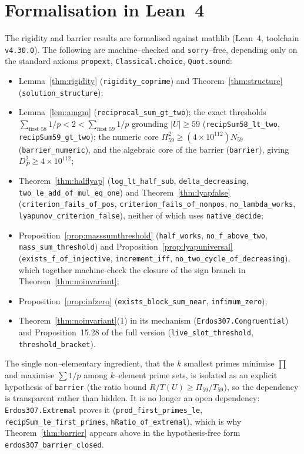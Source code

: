 \documentclass[11pt]{article}
\theoremstyle{definition}
\begin{document}
\section{Formalisation in Lean~4}\label{sec:lean}

The rigidity and barrier results are formalised against mathlib (Lean~4, toolchain
\texttt{v4.30.0}). The following are machine--checked and \texttt{sorry}--free, depending only on the
standard axioms \texttt{propext}, \texttt{Classical.choice}, \texttt{Quot.sound}:
\begin{itemize}[leftmargin=1.4em]
\item Lemma~\ref{thm:rigidity} (\texttt{rigidity\_coprime}) and Theorem~\ref{thm:structure}
(\texttt{solution\_structure});
\item Lemma~\ref{lem:amgm} (\texttt{reciprocal\_sum\_gt\_two}); the exact thresholds
$\sum_{\text{first }58}1/p<2<\sum_{\text{first }59}1/p$ grounding $|U|\ge59$
(\texttt{recipSum58\_lt\_two}, \texttt{recipSum59\_gt\_two}); the numeric core
$\Pi_{59}^2\ge(4\times10^{112})N_{59}$ (\texttt{barrier\_numeric}), and the algebraic core of the
barrier (\texttt{barrier}), giving $D_P^2\ge4\times10^{112}$;
\item Theorem~\ref{thm:halflyap} (\texttt{log\_lt\_half\_sub}, \texttt{delta\_decreasing},
\texttt{two\_le\_add\_of\_mul\_eq\_one}) and Theorem~\ref{thm:lyapfalse}
(\texttt{criterion\_fails\_of\_pos}, \texttt{criterion\_fails\_of\_nonpos},
\texttt{no\_lambda\_works}, \texttt{lyapunov\_criterion\_false}), neither of which uses
\texttt{native\_decide};
\item Proposition~\ref{prop:masssumthreshold} (\texttt{half\_works}, \texttt{no\_f\_above\_two},
\texttt{mass\_sum\_threshold}) and Proposition~\ref{prop:lyapuniversal}
(\texttt{exists\_f\_of\_injective}, \texttt{increment\_iff},
\texttt{no\_two\_cycle\_of\_decreasing}), which together machine-check the closure of the sign
branch in Theorem~\ref{thm:noinvariant};
\item Proposition~\ref{prop:infzero} (\texttt{exists\_block\_sum\_near}, \texttt{infimum\_zero});
\item Theorem~\ref{thm:noinvariant}(1) in its mechanism (\texttt{Erdos307.Congruential}) and
Proposition~15.28 of the full version (\texttt{live\_slot\_threshold}, \texttt{threshold\_bracket}).
\end{itemize}
The single non--elementary ingredient, that the $k$ smallest primes minimise $\prod$ and maximise
$\sum1/p$ among $k$--element prime sets, is isolated as an explicit hypothesis of \texttt{barrier}
(the ratio bound $R/T(U)\ge\Pi_{59}/T_{59}$), so the dependency is transparent rather than hidden.
It is no longer an open dependency: \texttt{Erdos307.Extremal} proves it
(\texttt{prod\_first\_primes\_le}, \texttt{recipSum\_le\_first\_primes},
\texttt{hRatio\_of\_extremal}), which is why Theorem~\ref{thm:barrier} appears above in the
hypothesis-free form \texttt{erdos307\_barrier\_closed}.
\end{document}
